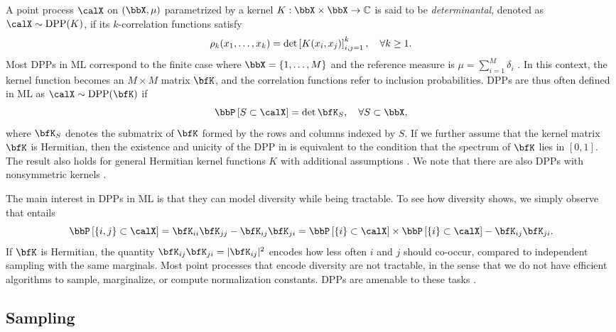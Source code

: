 \documentclass[twoside,11pt]{article}
\begin{document}
    A point process $\calX$ on $(\bbX,\mu)$ parametrized by a kernel $K:\bbX\times \bbX\rightarrow \mathbb{C}$ is said to be \emph{determinantal}, denoted as $\calX\sim\DPP(K)$, if its $k$-correlation functions satisfy
	  \begin{equation*}
	  \label{eq:k-correlation_function_DPP}
	    \rho_k(x_1,\dots,x_k)
	      = \det \left[ K(x_i, x_j) \right]_{i,j=1}^k,
	    \quad \forall k\geq 1.
	  \end{equation*}
		Most DPPs in ML correspond to the finite case where $\bbX = \lrcb{1,\dots,M}$ and the reference measure is $\mu=\sum_{i=1}^M \delta_i$ \citep{KuTa12}.
		In this context, the kernel function becomes an $M\times M$ matrix $\bfK$, and the correlation functions refer to inclusion probabilities.
    DPPs are thus often defined in ML as $\calX\sim \DPP(\bfK)$ if
	  \begin{equation}
	  \label{eq:inclusion_proba_finite}
	    \Proba{S \subset \calX} = \det {\bfK}_S,
	      \quad\forall S\subset \bbX,
	  \end{equation}
    where ${\bfK}_S$ denotes the submatrix of $\bfK$ formed by the rows and columns indexed by $S$.
    If we further assume that the kernel matrix $\bfK$ is Hermitian, then the existence and unicity of the DPP in  is equivalent to the condition that the spectrum of $\bfK$ lies in $[0,1]$.
    The result also holds for general Hermitian kernel functions $K$ with additional assumptions \cite[Theorem 3]{Sos00}.
    We note that there are also DPPs with nonsymmetric kernels \citep{BoDiFu10}.

    The main interest in DPPs in ML is that they can model diversity while being tractable.
    To see how diversity shows, we simply observe that  entails
    $$ \Proba{\{i,j\} \subset \calX} = {\bfK}_{ii}{\bfK}_{jj}-{\bfK}_{ij}{\bfK}_{ji} = \Proba{\{i\} \subset \calX}\times \Proba{\{i\} \subset \calX} - {\bfK}_{ij}{\bfK}_{ji}.$$
    If $\bfK$ is Hermitian, the quantity ${\bfK}_{ij}{\bfK}_{ji} = \vert{\bfK}_{ij}\vert^2$ encodes how less often $i$ and $j$ should co-occur, compared to independent sampling with the same marginals.
    Most point processes that encode diversity are not tractable, in the sense that we do not have efficient algorithms to sample, marginalize, or compute normalization constants.
    DPPs are amenable to these tasks \citep{KuTa12}.

  \subsection{Sampling} %
  \label{sub:sampling}
\end{document}
